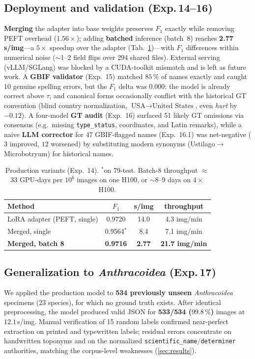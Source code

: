 \subsection{Deployment and validation (Exp.\,14--16)}
\label{sec:deploy}
\textbf{Merging} the adapter into base weights preserves $F_1$ exactly while
removing PEFT overhead ($1.56\times$); adding \textbf{batched} inference
(batch~8) reaches \textbf{2.77\,s/img}---a $5\times$ speedup over the adapter
(Tab.~\ref{tab:deploy})---with $F_1$ differences within numerical noise
($\sim$1--2 field flips over 294 shared files). External serving (vLLM/SGLang)
was blocked by a CUDA-toolkit mismatch and is left as future work. A
\textbf{GBIF validator} (Exp.~15) matched $85\,\%$ of names exactly and caught
10 genuine spelling errors, but the $F_1$ delta was $0.000$: the model is
already correct above $\tau$, and canonical forms occasionally conflict with the
historical GT convention (blind country normalization,
$\text{USA}\!\rightarrow\!\text{United States}$, even \emph{hurt} by $-0.12$).
A four-model \textbf{GT audit} (Exp.~16) surfaced 51 likely GT omissions via
consensus (e.g.\ missing \texttt{type\_status}, coordinates, and Latin
remarks), while a naive \textbf{LLM corrector} for 47 GBIF-flagged names
(Exp.~16.1) was net-negative ($3$ improved, $12$ worsened) by substituting
modern synonyms (Ustilago$\rightarrow$Microbotryum) for historical names.

\begin{table}[t]
\centering
\small
\setlength{\tabcolsep}{4pt}
\begin{tabular}{@{}lccc@{}}
\toprule
Method & $F_1$ & s/img & throughput \\
\midrule
LoRA adapter (PEFT, single) & 0.9720 & 14.0 & 4.3 img/min \\
Merged, single & 0.9564$^{\ast}$ & 8.4 & 7.1 img/min \\
\textbf{Merged, batch 8} & \textbf{0.9716} & \textbf{2.77} & \textbf{21.7 img/min} \\
\bottomrule
\end{tabular}
\caption{Production variants (Exp.~14). $^{\ast}$on 79-test. Batch-8 throughput
$\approx$33 GPU-days per $10^6$ images on one H100, or $\sim$8--9 days on
$4\times$H100.}
\label{tab:deploy}
\end{table}

\subsection{Generalization to \emph{Anthracoidea} (Exp.\,17)}
\label{sec:anth}
We applied the production model to \textbf{534 previously unseen}
\emph{Anthracoidea} specimens (23 species), for which no ground truth exists.
After identical preprocessing, the model produced valid JSON for
\textbf{533/534 ($99.8\,\%$)} images at $12.1$\,s/img. Manual verification of 15
random labels confirmed near-perfect extraction on printed and typewritten
labels; residual errors concentrate on handwritten toponyms and on the
normalized \texttt{scientific\_name}/\texttt{determiner} authorities, matching
the corpus-level weaknesses (\cref{sec:results}).
